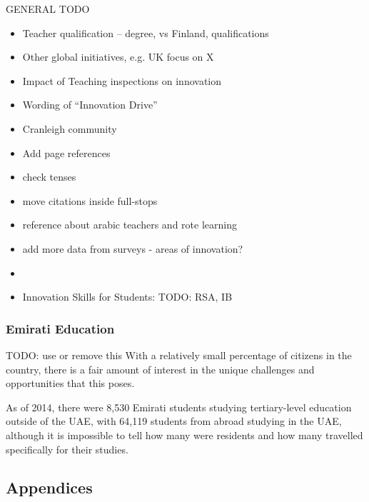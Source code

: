 GENERAL TODO
\begin{itemize}
\item Teacher qualification – degree, vs Finland, qualifications
\item Other global initiatives, e.g. UK focus on X
\item Impact of Teaching inspections on innovation
\item Wording of “Innovation Drive”
\item Cranleigh community
\item Add page references
\item check tenses
\item move citations inside full-stops
\item reference about arabic teachers and rote learning
\item add more data from surveys - areas of innovation?
\item \cite{Cordingley2007}
\item Innovation Skills for Students: TODO: RSA, IB
\end{itemize}

\subsubsection{Emirati Education} TODO: use or remove this
With a relatively small percentage of citizens in the country, there is a fair amount of interest in the unique challenges and opportunities that this poses.

As of 2014, there were 8,530 Emirati students studying tertiary-level education outside of the UAE, with 64,119 students from abroad studying in the UAE, although it is impossible to tell how many were residents and how many travelled specifically for their studies.

\subsection{Appendices}

